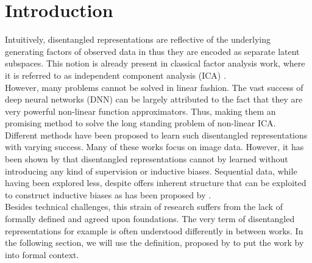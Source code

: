 \documentclass{article} %
\begin{document}
\section*{Introduction}
Intuitively, disentangled representations are reflective of the underlying generating factors of observed data in thus they are encoded as separate latent subspaces. This notion is already present in classical factor analysis work, where it is referred to as independent component analysis (ICA) \cite{comon1992independent}.\\
However, many problems cannot be solved in linear fashion. The vast success of deep neural networks (DNN) can be largely attributed to the fact that they are very powerful non-linear function approximators. Thus, making them an promising method to solve the long standing problem of non-linear ICA.\\
Different methods have been proposed to learn such disentangled representations \cite{higgins2016beta, chen2016infogan, kulkarni2015deep} with varying success. Many of these works focus on image data. However, it has been shown by \citet{locatello2019challenging} that disentangled representations cannot by learned without introducing any kind of supervision or inductive biases. Sequential data, while having been explored less, despite offers inherent structure that can be exploited to construct inductive biases as has been proposed by \citet{hsu2017unsupervised}.\\
Besides technical challenges, this strain of research suffers from the lack of formally defined and agreed upon foundations. The very term of disentangled representations for example is often understood differently in between works. In the following section, we will use the definition, proposed by \citet{higgins2018towards} to put the work by \citet{hsu2017unsupervised} into formal context. 
\end{document}
